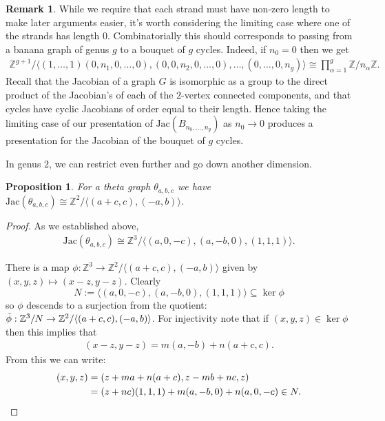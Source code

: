 \documentclass[11pt]{article}
\newtheorem{prop}[theo]{Proposition}
\theoremstyle{definition}
\newtheorem{rema}[theo]{Remark}
\numberwithin{equation}{section}
\newcommand{\Z}{\mathbb{Z}}
\newcommand{\jac}[1]{\mathrm{Jac}\left({#1}\right)}
\newcommand{\gen}[1]{\langle #1 \rangle}
\begin{document}
\begin{rema}
    While we require that each strand must have non-zero length to make later arguments easier, it's worth considering the limiting case where one of the strands has length $0$. Combinatorially this should corresponds to passing from a banana graph of genus $g$ to a bouquet of $g$ cycles. Indeed, if $n_0 = 0$ then we get
    \begin{align*}
        \Z^{g+1}/\gen{(1,\dots,1)(0,n_1,0,\dots,0),(0,0,n_2,0,\dots,0),\dots,(0,\dots,0,n_g)} \cong \prod_{\alpha = 1}^g\Z/n_\alpha\Z.
    \end{align*}
    Recall that the Jacobian of a graph $G$ is isomorphic as a group to the direct product of the Jacobian's of each of the $2$-vertex connected components, and that cycles have cyclic Jacobians of order equal to their length. Hence taking the limiting case of our presentation of $\jac{B_{n_0,\dots,n_g}}$ as $n_0 \to 0$ produces a presentation for the Jacobian of the bouquet of $g$ cycles.
\end{rema}


In genus $2$, we can restrict even further and go down another dimension.

\begin{prop}
    For a theta graph $\theta_{a,b,c}$ we have $\jac{\theta_{a,b,c}} \cong \Z^2/\gen{(a+c,c),(-a,b)}$.
\end{prop}


\begin{proof}
    
As we established above,
\begin{align*}
    \jac{\theta_{a,b,c}} \cong \Z^3/\gen{(a,0,-c),(a,-b,0),(1,1,1)}.
\end{align*}

There is a map $\phi:\Z^3 \to \Z^2/\gen{(a+c,c),(-a,b)}$ given by $(x,y,z)\mapsto (x-z,y-z)$. Clearly $$N:=\gen{(a,0,-c),(a,-b,0),(1,1,1)} \subseteq \ker{\phi}$$ so $\phi$ descends to a surjection from the quotient: $\Tilde{\phi}:\Z^3/N\to \Z^2/\gen{(a+c,c),(-a,b)}$. For injectivity note that if $(x,y,z) \in \ker{\phi}$ then this implies that 
\begin{align*}
    (x-z,y-z) = m(a,-b)+n(a+c,c).
\end{align*}
From this we can write:
\begin{align*}
    (x,y,z) &= (z+ma+n(a+c),z-mb+nc,z) \\&= (z+nc)(1,1,1) + m(a,-b,0)+n(a,0,-c) \in N. \qedhere
\end{align*}
\end{proof}
\end{document}
